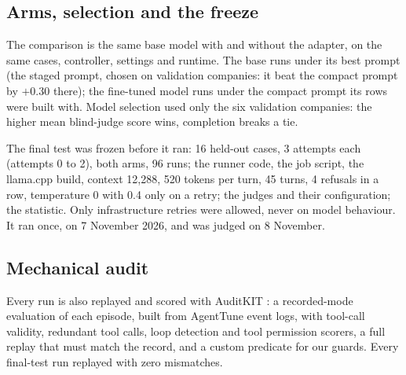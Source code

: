 \subsection{Arms, selection and the freeze}
The comparison is the same base model with and without the adapter, on the same cases, controller, settings and
runtime. The base runs under its best prompt (the staged prompt, chosen on validation companies: it beat the compact
prompt by $+0.30$ there); the fine-tuned model runs under the compact prompt its rows were built with. Model selection
used only the six validation companies: the higher mean blind-judge score wins, completion breaks a tie.

The final test was frozen before it ran: 16 held-out cases, 3 attempts each (attempts 0 to 2), both arms, 96 runs; the
runner code, the job script, the llama.cpp build, context 12{,}288, 520 tokens per turn, 45 turns, 4 refusals in a row,
temperature 0 with 0.4 only on a retry; the judges and their configuration; the statistic. Only infrastructure retries
were allowed, never on model behaviour. It ran once, on 7 November 2026, and was judged on 8 November.

\subsection{Mechanical audit}
Every run is also replayed and scored with AuditKIT \citep{auditkit}: a recorded-mode evaluation of each episode, built
from AgentTune event logs, with tool-call validity, redundant tool calls, loop detection and tool permission scorers, a
full replay that must match the record, and a custom predicate for our guards. Every final-test run replayed with zero
mismatches.
